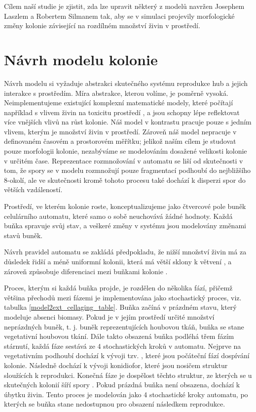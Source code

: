 \documentclass{article}
\begin{document}
Cílem naší studie je zjistit, zda lze upravit některý z modelů navržen Josephem Laszlem a Robertem Silmanem \cite{solidSubstrates} tak, aby se v simulaci projevily morfologické změny kolonie závisející na rozdílném množství živin v prostředí.

\section{Návrh modelu kolonie}

Návrh modelu si vyžaduje abstrakci skutečného systému reprodukce hub a jejich interakce s prostředím. Míra abstrakce, kterou volíme, je poměrně vysoká.  Neimplementujeme existující komplexní matematické modely, které počítají například s vlivem živin na toxicitu prostředí \cite{toxicMetals}, a jsou schopny lépe reflektovat více vnějších vlivů na růst kolonie. Náš model v kontrastu pracuje pouze s jedním vlivem, kterým je množství živin v prostředí. Zároveň náš model nepracuje v definovaném časovém a prostorovém měřítku; jelikož naším cílem je studovat pouze morfologii kolonie, nezabýváme se modelováním dosažené velikosti kolonie v určitém čase. Reprezentace rozmnožování v automatu se liší od skutečnosti v tom, že spory se v modelu rozmnožují pouze fragmentací podhoubí do nejbližšího 8-okolí, ale ve skutečnosti kromě tohoto procesu také dochází k disperzi spor do větších vzdáleností.

Prostředí, ve kterém kolonie roste, konceptualizujeme jako čtvercové pole buněk celulárního automatu, které samo o sobě neuchovává žádné hodnoty. Každá buňka spravuje svůj stav, a veškeré změny v systému jsou modelovány změnami stavů buněk.

Návrh pravidel automatu se zakládá předpokladu, že nižší množství živin má za důsledek řidší a méně uniformní kolonii, která má větší sklony k větvení \cite{solidSubstrates} \cite{morphological}, a zároveň způsobuje diferenciaci mezi buňkami kolonie \cite{differentiation}. 

Proces, kterým si každá buňka projde, je rozdělen do několika fází, přičemž většina přechodů mezi fázemi je implementována jako stochastický proces, viz. tabulka \ref{model2ext_cellaging_table}. Buňka začíná v prázdném stavu, který modeluje absenci biomasy. Pokud je v jejím prostředí určité množství neprázdných buněk, t. j. buněk reprezentujících houbovou tkáň, buňka se stane vegetativní houbovou tkání. Dále takto obsazená buňka podléhá třem fázím stárnutí, každá fáze sestává ze 4 stochastických kroků v automatu. Nejprve na vegetativním podhoubí dochází k vývoji tzv. , které jsou počáteční fází dospívání kolonie. Následně dochází k vývoji konidiofor, které jsou nosičem struktur sloužících k reprodukci. Konečná fáze je dospělost těchto struktur, ze kterých se u skutečných kolonií šíří spory \cite{differentiation}. Pokud prázdná buňka není obsazena, dochází k úbytku živin. Tento proces je modelován jako 4 stochastické kroky automatu, po kterých se buňka stane nedostupnou pro obsazení následkem reprodukce. 
\end{document}
